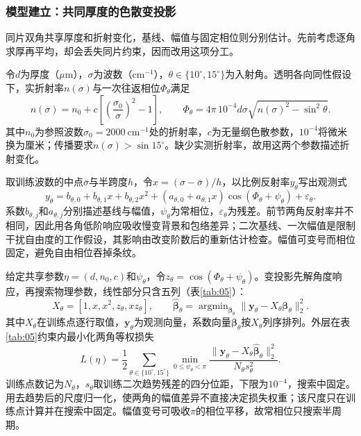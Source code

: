 \subsubsection{模型建立：共同厚度的色散变投影}

同片双角共享厚度和折射变化，基线、幅值与固定相位则分别估计。先前考虑逐角求厚再平均，却会丢失同片约束，因而改用这项分工。

令$d$为厚度（$\mu\mathrm{m}$），$\sigma$为波数（$\mathrm{cm}^{-1}$），$\theta\in\{10^\circ,15^\circ\}$为入射角。透明各向同性假设下，实折射率$n(\sigma)$与一次往返相位$\Phi_\theta$满足
\begin{equation}
n(\sigma)=n_0+c\left[\left(\frac{\sigma_0}{\sigma}\right)^2-1\right],\qquad
\Phi_\theta=4\pi\,10^{-4}d\sigma\sqrt{n(\sigma)^2-\sin^2\theta}.
\label{eq:q2-phase}
\end{equation}
其中$n_0$为参照波数$\sigma_0=2000\ \mathrm{cm}^{-1}$处的折射率，$c$为无量纲色散参数，$10^{-4}$将微米换为厘米；传播要求$n(\sigma)>\sin15^\circ$。缺少实测折射率，故用这两个参数描述折射变化。

取训练波数的中点$\bar\sigma$与半跨度$h$，令$x=(\sigma-\bar\sigma)/h$，以比例反射率$y_\theta$写出观测式
\begin{equation}
y_\theta=b_{\theta,0}+b_{\theta,1}x+b_{\theta,2}x^2
+ (a_{\theta,0}+a_{\theta,1}x)\cos(\Phi_\theta+\psi_\theta)+\varepsilon_\theta.
\label{eq:q2-model}
\end{equation}
系数$b_{\theta,j}$和$a_{\theta,j}$分别描述基线与幅值，$\psi_\theta$为常相位，$\varepsilon_\theta$为残差。前节两角反射率并不相同，因此用各角低阶响应吸收慢变背景和包络差异；二次基线、一次幅值是限制干扰自由度的工作假设，其影响由改变阶数后的重新估计检查。幅值可变号而相位固定，避免自由相位吞掉条纹。

给定共享参数$\eta=(d,n_0,c)$和$\psi_\theta$，令$z_\theta=\cos(\Phi_\theta+\psi_\theta)$。变投影先解角度响应，再搜索物理参数，线性部分只含五列（表\ref{tab:05}）：
\begin{equation}
X_\theta=[1,x,x^2,z_\theta,xz_\theta],\qquad
\widehat{\boldsymbol\beta}_\theta=\mathop{\arg\min}_{\boldsymbol\beta_\theta}
\|\boldsymbol y_\theta-X_\theta\boldsymbol\beta_\theta\|_2^2.
\label{eq:q2-projection}
\end{equation}
其中$X_\theta$在训练点逐行取值，$\boldsymbol y_\theta$为观测向量，系数向量$\boldsymbol\beta_\theta$按$X_\theta$列序排列。外层在表\ref{tab:05}约束内最小化两角等权损失
\begin{equation}
L(\eta)=\frac12\sum_{\theta\in\{10^\circ,15^\circ\}}
\min_{0\leq\psi_\theta<\pi}
\frac{\|\boldsymbol y_\theta-X_\theta\widehat{\boldsymbol\beta}_\theta\|_2^2}{N_\theta s_\theta^2}.
\label{eq:q2-loss}
\end{equation}
训练点数记为$N_\theta$，$s_\theta$取训练二次趋势残差的四分位距，下限为$10^{-4}$，搜索中固定。用去趋势后的尺度归一化，使两角的幅值差异不直接决定损失权重；该尺度只在训练点计算并在搜索中固定。幅值变号可吸收$\pi$的相位平移，故常相位只搜索半周期。

